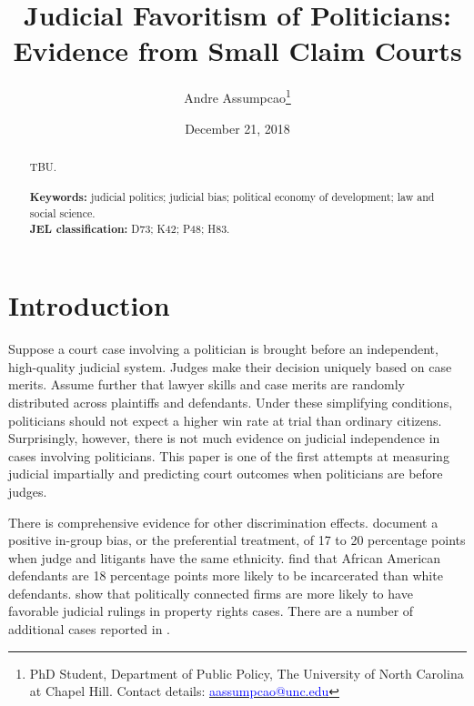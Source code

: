 \documentclass[11pt]{article}
\begin{document}
\begin{titlepage}
\title{Judicial Favoritism of Politicians: Evidence from Small Claim Courts}
\author{Andre Assumpcao\thanks{PhD Student, Department of Public Policy, The University of North Carolina at Chapel Hill. Contact details: \href{mailto:aassumpcao@unc.edu}{\textcolor{blue}{aassumpcao@unc.edu}}}}
\date{December 21, 2018}

\maketitle

\begin{abstract}
\noindent TBU. \\
\vspace{0in} \\
\noindent\textbf{Keywords:} judicial politics; judicial bias; political economy of development; law and social science. \\

\noindent\textbf{JEL classification:} D73; K42; P48; H83. \\

\vspace{0in}
\bigskip

\end{abstract}

\setcounter{page}{0}

\thispagestyle{empty}

\end{titlepage}

\clearpage

\section{Introduction} \label{sec:introduction_paper2}

Suppose a court case involving a politician is brought before an independent, high-quality judicial system. Judges make their decision uniquely based on case merits. Assume further that lawyer skills and case merits are randomly distributed across plaintiffs and defendants. Under these simplifying conditions, politicians should not expect a higher win rate at trial than ordinary citizens. Surprisingly, however, there is not much evidence on judicial independence in cases involving politicians. This paper is one of the first attempts at measuring judicial impartially and predicting court outcomes when politicians are before judges.

There is comprehensive evidence for other discrimination effects. \citet{ShayoJudicialIngroupBias2011} document a positive in-group bias, or the preferential treatment, of 17 to 20 percentage points when judge and litigants have the same ethnicity. \citet{AbramsJudgesVaryTheir2012} find that African American defendants are 18 percentage points more likely to be incarcerated than white defendants. \citet{LuPoliticalConnectednessCourt2015} show that politically connected firms are more likely to have favorable judicial rulings in property rights cases. There are a number of additional cases reported in \citet{RachlinskiJudgingJudiciaryNumbers2017}.
\end{document}
